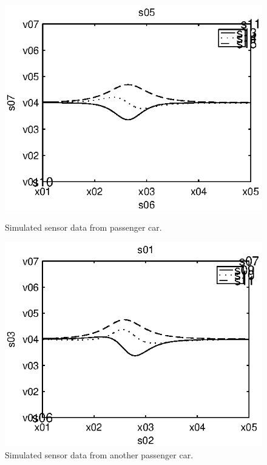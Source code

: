 \begin{subfigures}
\begin{figure}[tfhb]
 \centering
 \begin{minipage}{0.45\linewidth}
 	\centering
 	
	\includegraphics[width=1\linewidth]{images/passengercar}
  	\caption[Simulated sensor data from passenger car]{Simulated sensor data from passenger car.}
  	\label{fig:simclass1} 
 \end{minipage} \hfill
 \begin{minipage}{0.45\linewidth}
 	\centering
 	
  	\includegraphics[width=1\linewidth]{images/passengercar2}
  	\caption[Simulated sensor data from another passenger car]{Simulated sensor data from another passenger car.}
  	\label{fig:simclass2}
 \end{minipage}
  

\end{figure}
\end{subfigures}
